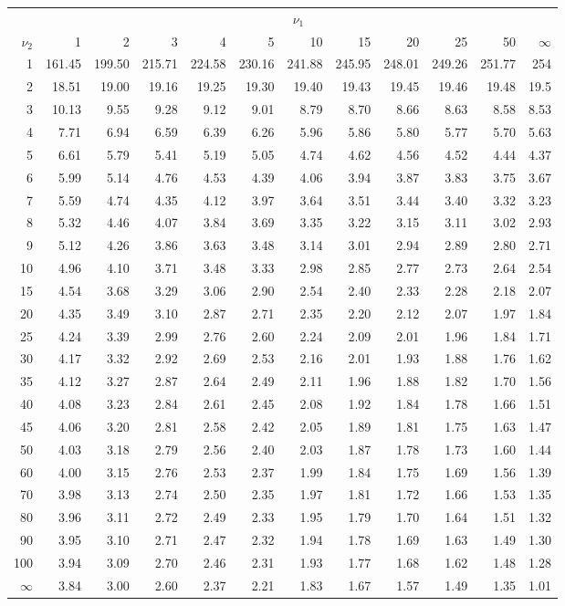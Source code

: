 \documentclass{article}
\begin{document}
\begin{tabular}{|r|rrrrrrrrrrr|}
	\hline
	& \multicolumn{11}{|c|}{$\nu_1$} \\ 
	$\nu_2$ & 1 & 2 & 3 & 4 & 5 & 10 & 15 & 20 & 25 & 50 & $\infty$\\ \hline
	1 & 161.45 & 199.50 & 215.71 & 224.58 & 230.16 & 241.88 & 245.95 & 248.01 & 249.26 & 251.77 & 254\\ 
	2 & 18.51 & 19.00 & 19.16 & 19.25 & 19.30 & 19.40 & 19.43 & 19.45 & 19.46 & 19.48 & 19.5\\ 
	3 & 10.13 & 9.55 & 9.28 & 9.12 & 9.01 & 8.79 & 8.70 & 8.66 & 8.63 & 8.58 & 8.53\\ 
	4 & 7.71 & 6.94 & 6.59 & 6.39 & 6.26 & 5.96 & 5.86 & 5.80 & 5.77 & 5.70 & 5.63\\ 
	5 & 6.61 & 5.79 & 5.41 & 5.19 & 5.05 & 4.74 & 4.62 & 4.56 & 4.52 & 4.44 & 4.37\\ 
	6 & 5.99 & 5.14 & 4.76 & 4.53 & 4.39 & 4.06 & 3.94 & 3.87 & 3.83 & 3.75 & 3.67\\ 
	7 & 5.59 & 4.74 & 4.35 & 4.12 & 3.97 & 3.64 & 3.51 & 3.44 & 3.40 & 3.32 & 3.23\\ 
	8 & 5.32 & 4.46 & 4.07 & 3.84 & 3.69 & 3.35 & 3.22 & 3.15 & 3.11 & 3.02 & 2.93\\ 
	9 & 5.12 & 4.26 & 3.86 & 3.63 & 3.48 & 3.14 & 3.01 & 2.94 & 2.89 & 2.80 & 2.71\\ 
	10 & 4.96 & 4.10 & 3.71 & 3.48 & 3.33 & 2.98 & 2.85 & 2.77 & 2.73 & 2.64 & 2.54\\ 
	15 & 4.54 & 3.68 & 3.29 & 3.06 & 2.90 & 2.54 & 2.40 & 2.33 & 2.28 & 2.18 & 2.07\\ 
	20 & 4.35 & 3.49 & 3.10 & 2.87 & 2.71 & 2.35 & 2.20 & 2.12 & 2.07 & 1.97 & 1.84\\ 
	25 & 4.24 & 3.39 & 2.99 & 2.76 & 2.60 & 2.24 & 2.09 & 2.01 & 1.96 & 1.84 & 1.71\\ 
	30 & 4.17 & 3.32 & 2.92 & 2.69 & 2.53 & 2.16 & 2.01 & 1.93 & 1.88 & 1.76 & 1.62\\ 
	35 & 4.12 & 3.27 & 2.87 & 2.64 & 2.49 & 2.11 & 1.96 & 1.88 & 1.82 & 1.70 & 1.56\\ 
	40 & 4.08 & 3.23 & 2.84 & 2.61 & 2.45 & 2.08 & 1.92 & 1.84 & 1.78 & 1.66 & 1.51\\ 
	45 & 4.06 & 3.20 & 2.81 & 2.58 & 2.42 & 2.05 & 1.89 & 1.81 & 1.75 & 1.63 & 1.47\\ 
	50 & 4.03 & 3.18 & 2.79 & 2.56 & 2.40 & 2.03 & 1.87 & 1.78 & 1.73 & 1.60 & 1.44\\ 
	60 & 4.00 & 3.15 & 2.76 & 2.53 & 2.37 & 1.99 & 1.84 & 1.75 & 1.69 & 1.56 & 1.39\\ 
	70 & 3.98 & 3.13 & 2.74 & 2.50 & 2.35 & 1.97 & 1.81 & 1.72 & 1.66 & 1.53 & 1.35\\ 
	80 & 3.96 & 3.11 & 2.72 & 2.49 & 2.33 & 1.95 & 1.79 & 1.70 & 1.64 & 1.51 & 1.32\\ 
	90 & 3.95 & 3.10 & 2.71 & 2.47 & 2.32 & 1.94 & 1.78 & 1.69 & 1.63 & 1.49 & 1.30\\ 
	100 & 3.94 & 3.09 & 2.70 & 2.46 & 2.31 & 1.93 & 1.77 & 1.68 & 1.62 & 1.48 & 1.28 \\ 
	$\infty$ & 3.84 & 3.00 & 2.60 & 2.37 & 2.21 & 1.83 & 1.67 & 1.57 & 1.49 & 1.35 & 1.01 \\ 
	\hline
\end{tabular}

	
\end{document}

